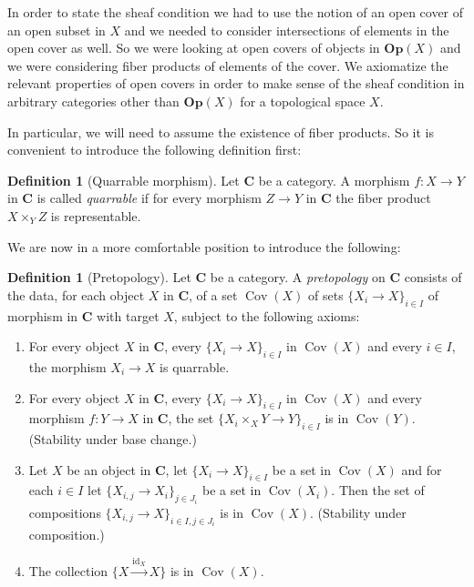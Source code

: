 \documentclass[12pt,reqno,a4paper]{amsart}
\theoremstyle{plain}
\theoremstyle{definition}
\newtheorem{defn}[thm]{Definition}
\theoremstyle{remark}
\begin{document}
In order to state the sheaf condition we had to use the notion of an open cover of an open subset in $X$ and we needed to consider intersections of elements in the open cover as well.
So we were looking at open covers of objects in $\mathbf{Op}(X)$ and we were considering fiber products of elements of the cover.
We axiomatize the relevant properties of open covers in order to make sense of the sheaf condition in arbitrary categories other than $\mathbf{Op}(X)$ for a topological space $X$.

In particular, we will need to assume the existence of fiber products.
So it is convenient to introduce the following definition first:

\begin{defn}[Quarrable morphism]
  Let $\mathbf{C}$ be a category.
  A morphism $f \colon X \to Y$ in $\mathbf{C}$ is called \textit{quarrable} if for every morphism $Z \to Y$ in $\mathbf{C}$ the fiber product $X \times_{Y} Z$ is representable.
\end{defn}

We are now in a more comfortable position to introduce the following:

\begin{defn}[Pretopology]
  Let $\mathbf{C}$ be a category.
  A \textit{pretopology} on $\mathbf{C}$ consists of the data, for each object $X$ in $\mathbf{C}$, of a set $\operatorname{Cov}(X)$ of sets $\{ X_{i} \to X \}_{i \in I}$ of morphism in $\mathbf{C}$ with target $X$, subject to the following axioms:
  \begin{enumerate}[label=(PT\arabic*)]\addtocounter{enumi}{-1}
    \item For every object $X$ in $\mathbf{C}$, every $\{ X_{i} \to X \}_{i \in I}$ in $\operatorname{Cov}(X)$ and every $i \in I$, the morphism $X_{i} \to X$ is quarrable.\label{pt:0}
    \item For every object $X$ in $\mathbf{C}$, every $\{ X_{i} \to X \}_{i \in I}$ in $\operatorname{Cov}(X)$ and every morphism $f \colon Y \to X$ in $\mathbf{C}$, the set $\{ X_{i} \times_{X} Y \to Y \}_{i \in I}$ is in $\operatorname{Cov}(Y)$.
      (Stability under base change.)\label{pt:1}
    \item Let $X$ be an object in $\mathbf{C}$, let $\{ X_{i} \to X \}_{i \in I}$ be a set in $\operatorname{Cov}(X)$ and for each $i \in I$ let $\{ X_{i,j} \to X_{i}\}_{j \in J_{i}}$ be a set in $\operatorname{Cov}(X_{i})$.
      Then the set of compositions $\{ X_{i,j} \to X \}_{i \in I, j \in J_{i}}$ is in $\operatorname{Cov}(X)$.
      (Stability under composition.)\label{pt:2}
    \item The collection $\{ X \xrightarrow{\operatorname{id}_{X}} X \}$ is in $\operatorname{Cov}(X)$.\label{pt:3}
  \end{enumerate}
\end{defn}
\end{document}
